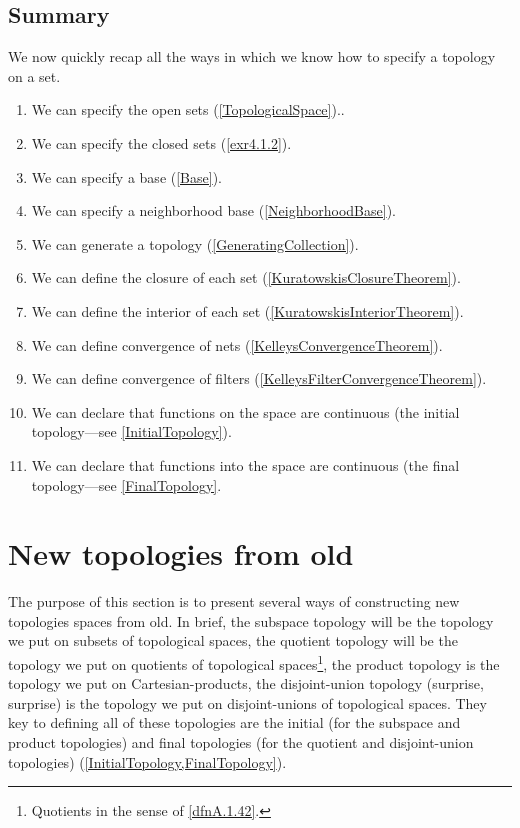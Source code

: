 \subsection{Summary}

We now quickly recap all the ways in which we know how to specify a topology on a set.
\begin{enumerate}
\item We can specify the open sets (\cref{TopologicalSpace})..
\item We can specify the closed sets (\cref{exr4.1.2}).
\item We can specify a base (\cref{Base}).
\item We can specify a neighborhood base (\cref{NeighborhoodBase}).
\item We can generate a topology (\cref{GeneratingCollection}).
\item We can define the closure of each set (\cref{KuratowskisClosureTheorem}).
\item We can define the interior of each set (\cref{KuratowskisInteriorTheorem}).
\item We can define convergence of nets (\cref{KelleysConvergenceTheorem}).
\item We can define convergence of filters (\cref{KelleysFilterConvergenceTheorem}).
\item We can declare that functions on the space are continuous (the initial topology---see \cref{InitialTopology}).
\item We can declare that functions into the space are continuous (the final topology---see \cref{FinalTopology}.
\end{enumerate}

\section{New topologies from old}

The purpose of this section is to present several ways of constructing new topologies spaces from old.  In brief, the subspace topology will be the topology we put on subsets of topological spaces, the quotient topology will be the topology we put on quotients of topological spaces\footnote{Quotients in the sense of \cref{dfnA.1.42}.}, the product topology is the topology we put on Cartesian-products, the disjoint-union topology (surprise, surprise) is the topology we put on disjoint-unions of topological spaces.  They key to defining all of these topologies are the initial (for the subspace and product topologies) and final topologies (for the quotient and disjoint-union topologies) (\cref{InitialTopology,FinalTopology}).

